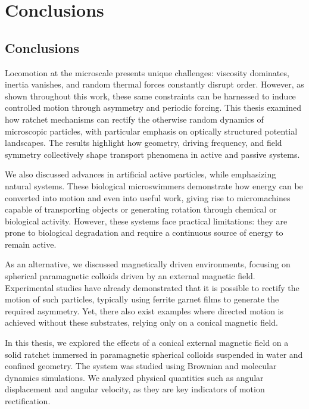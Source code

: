 \part{Conclusions}
\label{part:conclusions}

\chapter{Conclusions}

Locomotion at the microscale presents unique challenges: viscosity dominates, inertia vanishes, and random thermal forces constantly disrupt order. However, as shown throughout this work, these same constraints can be harnessed to induce controlled motion through asymmetry and periodic forcing. This thesis examined how ratchet mechanisms can rectify the otherwise random dynamics of microscopic particles, with particular emphasis on optically structured potential landscapes. The results highlight how geometry, driving frequency, and field symmetry collectively shape transport phenomena in active and passive systems.

We also discussed advances in artificial active particles, while emphasizing natural systems. These biological microswimmers demonstrate how energy can be converted into motion and even into useful work, giving rise to micromachines capable of transporting objects or generating rotation through chemical or biological activity. However, these systems face practical limitations: they are prone to biological degradation and require a continuous source of energy to remain active.

As an alternative, we discussed magnetically driven environments, focusing on spherical paramagnetic colloids driven by an external magnetic field. Experimental studies have already demonstrated that it is possible to rectify the motion of such particles, typically using ferrite garnet films to generate the required asymmetry. Yet, there also exist examples where directed motion is achieved without these substrates, relying only on a conical magnetic field.

In this thesis, we explored the effects of a conical external magnetic field on a solid ratchet immersed in paramagnetic spherical colloids suspended in water and confined geometry. The system was studied using Brownian and molecular dynamics simulations. We analyzed physical quantities such as angular displacement and angular velocity, as they are key indicators of motion rectification.

